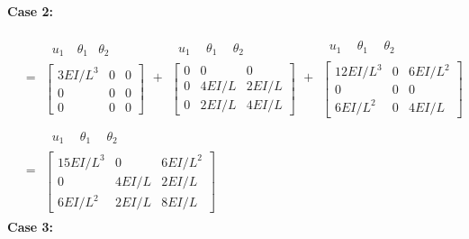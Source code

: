 \begin{example}
{\begin{align*}
\end{align*}}
\textbf{Case 2:}
\begin{fig}
  
\end{fig}
{\small
\begin{align*}
  [k] &= \begin{array}{c}\begin{array}{ccc}\ u_1\ & \theta_1 & \theta_2\end{array}\\ \left[\begin{array}{ccc}3EI/L^3 & 0 & 0\\ 0 & 0 & 0\\ 0 & 0 & 0\end{array}\right]\end{array}
  + \begin{array}{c}\begin{array}{ccc}\ u_1\ & \ \theta_1\ & \ \theta_2\ \end{array}\\ \left[\begin{array}{ccc}0 & 0 & 0\\ 0 & 4EI/L & 2EI/L\\ 0 & 2EI/L & 4EI/L\end{array}\right]\end{array}
  + \begin{array}{c}\begin{array}{ccc}\ u_1\ & \ \theta_1\ & \ \theta_2\ \end{array}\\ \left[\begin{array}{ccc}12EI/L^3 & 0 & 6EI/L^2\\ 0 & 0 & 0\\ 6EI/L^2 & 0 & 4EI/L\end{array}\right]\end{array}\\
  &= \begin{array}{c}\begin{array}{ccc}\ u_1\ & \ \theta_1\ & \ \theta_2\ \end{array}\\ \left[\begin{array}{ccc}15EI/L^3 & 0 & 6EI/L^2\\ 0 & 4EI/L & 2EI/L\\ 6EI/L^2 & 2EI/L & 8EI/L\end{array}\right]\end{array}
\end{align*}}
\textbf{Case 3:}

\end{example}
